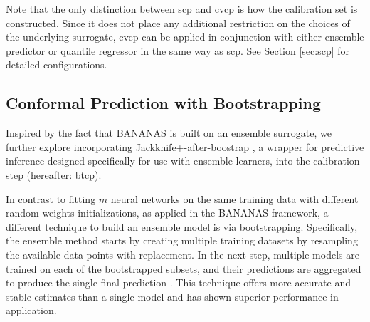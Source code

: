 Note that the only distinction between \gls{scp} and \gls{cvcp} is how the calibration set is constructed. Since it does not place any additional restriction on the choices of the underlying surrogate, \gls{cvcp} can be applied in conjunction with either ensemble predictor or quantile regressor in the same way as \gls{scp}. See Section \ref{sec:scp} for detailed configurations.

\subsection{Conformal Prediction with Bootstrapping}
Inspired by the fact that BANANAS is built on an ensemble surrogate, we further explore incorporating Jackknife+-after-boostrap \cite{kim2020predictive}, a wrapper for predictive inference designed specifically for use with ensemble learners, into the calibration step (hereafter: \gls{btcp}).

In contrast to fitting $m$ neural networks on the same training data with different random weights initializations, as applied in the BANANAS framework, a different technique to build an ensemble model is via bootstrapping. Specifically, the ensemble method starts by creating multiple training datasets by resampling the available data points with replacement. In the next step, multiple models are trained on each of the bootstrapped subsets, and their predictions are aggregated to produce the single final prediction \cite{breiman96}. This technique offers more accurate and stable estimates than a single model and has shown superior performance in application.

